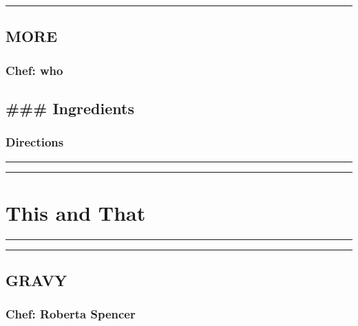 \documentclass[
]{book}
\begin{document}
\begin{center}\rule{0.5\linewidth}{0.5pt}\end{center}

\hypertarget{more-9}{%
\section*{MORE}\label{more-9}}


\hypertarget{chef-who-9}{%
\subsection*{Chef: who}\label{chef-who-9}}


\hypertarget{ingredients-112}{%
\section*{\#\#\# Ingredients}\label{ingredients-112}}


\hypertarget{directions-112}{%
\subsection*{Directions}\label{directions-112}}


\begin{center}\rule{0.5\linewidth}{0.5pt}\end{center}

\begin{center}\rule{0.5\linewidth}{0.5pt}\end{center}

\hypertarget{ThisThat}{%
\chapter{This and That}\label{ThisThat}}

\begin{center}\rule{0.5\linewidth}{0.5pt}\end{center}

\begin{center}\rule{0.5\linewidth}{0.5pt}\end{center}

\hypertarget{gravy}{%
\section*{GRAVY}\label{gravy}}


\hypertarget{chef-roberta-spencer-39}{%
\subsection*{Chef: Roberta Spencer}\label{chef-roberta-spencer-39}}
\end{document}
